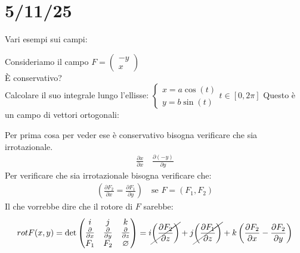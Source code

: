 \documentclass[a4paper, oneside]{article}
\begin{document}
\section{5/11/25}
Vari esempi sui campi:
\begin{example}
    Consideriamo il campo $F=\begin{pmatrix}
        -y\\
        x
    \end{pmatrix}$\\
    È conservativo?\\
    Calcolare il suo integrale lungo l'ellisse: $\begin{cases}
        x = a \cos(t)\\
        y = b \sin(t)
    \end{cases}t \in [0,2\pi]$
    Questo è un campo di vettori ortogonali:
    \begin{center}
    \end{center}
    Per prima cosa per veder ese è conservativo bisogna verificare che sia irrotazionale.
    \begin{gather*}
        \frac{\partial x}{\partial x} \quad \frac{\partial (-y)}{\partial y}
    \end{gather*}
    Per verificare che sia irrotazionale bisogna verificare che:
    \begin{gather*}
        \left( \frac{\partial F_2}{\partial x} = \frac{\partial F_1}{\partial y} \right) \quad \text{se } F=(F_1,F_2) 
    \end{gather*}
    Il che vorrebbe dire che il rotore di $F$ sarebbe:
    \begin{gather*}
        rotF(x,y) = \text{det}\begin{pmatrix}
            i & j & k\\
            \frac{\partial}{\partial x} & \frac{\partial}{\partial y} & \frac{\partial}{\partial z}\\
            F_1 & F_2 & \varnothing
        \end{pmatrix}= i \cancel{\left(\frac{\partial F_2}{\partial z}\right) } + j \cancel{\left(\frac{\partial F_1}{\partial z}\right)} + k \left(\frac{\partial F_2}{\partial x} - \frac{\partial F_2}{\partial y} \right)

\end{gather*}
\end{example}
\end{document}

